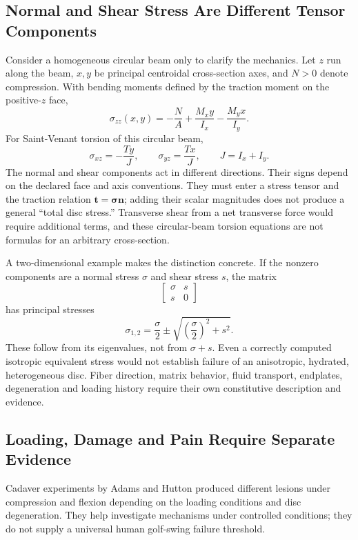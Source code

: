\subsection{Normal and Shear Stress Are Different Tensor Components}
Consider a homogeneous circular beam only to clarify the mechanics. Let $z$ run along the beam, $x,y$ be principal centroidal cross-section axes, and $N>0$ denote compression. With bending moments defined by the traction moment on the positive-$z$ face,
\begin{equation}
\sigma_{zz}(x,y)=-\frac{N}{A}
+\frac{M_x y}{I_x}-\frac{M_y x}{I_y}.
\end{equation}
For Saint-Venant torsion of this circular beam,
\begin{equation}
\sigma_{xz}=-\frac{T y}{J},\qquad
\sigma_{yz}=\frac{T x}{J},\qquad J=I_x+I_y.
\end{equation}
The normal and shear components act in different directions. Their signs depend on the declared face and axis conventions. They must enter a stress tensor and the traction relation $\bm t=\boldsymbol\sigma\bm n$; adding their scalar magnitudes does not produce a general ``total disc stress.'' Transverse shear from a net transverse force would require additional terms, and these circular-beam torsion equations are not formulas for an arbitrary cross-section.

A two-dimensional example makes the distinction concrete. If the nonzero components are a normal stress $\sigma$ and shear stress $s$, the matrix
\begin{equation}
\begin{bmatrix}\sigma&s\\s&0\end{bmatrix}
\end{equation}
has principal stresses
\begin{equation}
\sigma_{1,2}=\frac{\sigma}{2}
\pm\sqrt{\left(\frac{\sigma}{2}\right)^2+s^2}.
\end{equation}
These follow from its eigenvalues, not from $\sigma+s$. Even a correctly computed isotropic equivalent stress would not establish failure of an anisotropic, hydrated, heterogeneous disc. Fiber direction, matrix behavior, fluid transport, endplates, degeneration and loading history require their own constitutive description and evidence.

\subsection{Loading, Damage and Pain Require Separate Evidence}
Cadaver experiments by Adams and Hutton produced different lesions under compression and flexion depending on the loading conditions and disc degeneration. They help investigate mechanisms under controlled conditions; they do not supply a universal human golf-swing failure threshold. \citep{Adams1982ProlapsedDisc}

